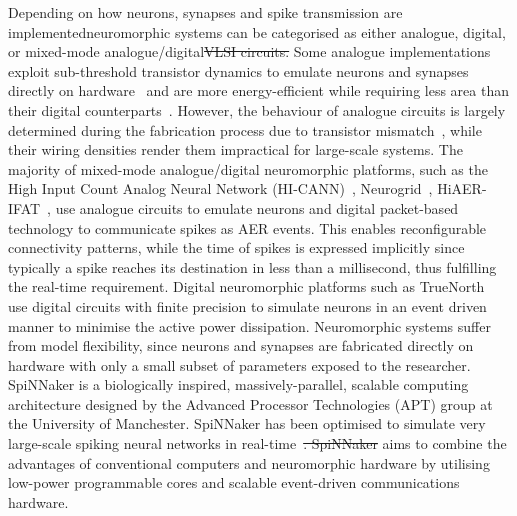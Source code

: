 \documentclass{frontiersENG} %
\providecommand{\DIFadd}[1]{{\protect\color{blue}\uwave{#1}}} %
\providecommand{\DIFdel}[1]{{\protect\color{red}\sout{#1}}}                      %
\providecommand{\DIFaddbegin}{} %
\providecommand{\DIFaddend}{} %
\providecommand{\DIFdelbegin}{} %
\providecommand{\DIFdelend}{} %
\begin{document}
Depending on how neurons, synapses and spike transmission are implemented\DIFaddbegin \DIFadd{, }\DIFaddend neuromorphic systems can be categorised as either analogue, digital, or mixed-mode analogue/digital\DIFdelbegin \DIFdel{VLSI circuits. }\DIFdelend \DIFaddbegin \DIFadd{. %
}\DIFaddend Some analogue implementations exploit sub-threshold transistor dynamics to emulate neurons and synapses directly on hardware~\citep{indiveri2011neuromorphic} and are more energy-efficient while requiring less area than their digital counterparts~\citep{joubert2012hardware}. However, the behaviour of analogue circuits is largely determined during the fabrication process due to transistor mismatch~\citep{indiveri2011neuromorphic,pedram2006thermal,linares2003compact}, while their wiring densities render them impractical for large-scale systems. The majority of mixed-mode analogue/digital neuromorphic platforms, such as the High Input Count Analog Neural Network (HI-CANN)~\citep{schemmel2010wafer}, Neurogrid~\citep{benjamin2014neurogrid}, HiAER-IFAT~\citep{yu201265k}, use analogue circuits to emulate neurons and digital packet-based technology to communicate spikes as AER events. This enables reconfigurable connectivity patterns, while the time of spikes is expressed implicitly since typically a spike reaches its destination in less than a millisecond, thus fulfilling the real-time requirement. Digital neuromorphic platforms such as TrueNorth~\citep{merolla2014million} use digital circuits with finite precision to simulate neurons in an event driven manner to minimise the active power dissipation. Neuromorphic systems suffer from model flexibility, since neurons and synapses are fabricated directly on hardware with only a small subset of parameters exposed to the researcher. 
SpiNNaker is a biologically inspired, massively-parallel, scalable computing architecture designed by the Advanced Processor Technologies (APT) group at the University of Manchester. SpiNNaker has been optimised to simulate very large-scale spiking neural networks in real-time~\citep{furber2014spinnaker}\DIFdelbegin \DIFdel{. SpiNNaker }\DIFdelend \DIFaddbegin \DIFadd{, while it }\DIFaddend aims to combine the advantages of conventional computers and neuromorphic hardware by utilising low-power programmable cores and scalable event-driven communications hardware.
\end{document}
